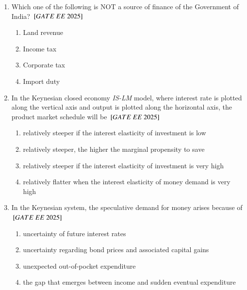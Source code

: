 \documentclass[journal,12pt,onecolumn]{IEEEtran}
\theoremstyle{remark}
\begin{document}
\begin{enumerate}
\item Which one of the following is NOT a source of finance of the Government of India?
$\sbrak{GATE\ EE\ 2025}$\\
    \begin{enumerate}[label=(\Alph*)]
    \item Land revenue
    \item Income tax
    \item Corporate tax
    \item Import duty
    \end{enumerate}
 
\item In the Keynesian closed economy \textit{IS-LM} model, where interest rate is plotted along the vertical axis and output is plotted along the horizontal axis, the product market schedule will be
$\sbrak{GATE\ EE\ 2025}$\\
    \begin{enumerate}[label=(\Alph*)]
    \item relatively steeper if the interest elasticity of investment is low
    \item relatively steeper, the higher the marginal propensity to save
    \item relatively steeper if the interest elasticity of investment is very high
    \item relatively flatter when the interest elasticity of money demand is very high
    \end{enumerate}
 
\item In the Keynesian system, the speculative demand for money arises because of
$\sbrak{GATE\ EE\ 2025}$\\
    \begin{enumerate}[label=(\Alph*)]
    \item uncertainty of future interest rates
    \item uncertainty regarding bond prices and associated capital gains
    \item unexpected out-of-pocket expenditure
    \item the gap that emerges between income and sudden eventual expenditure
    \end{enumerate}
 

\end{enumerate}
\end{document}
